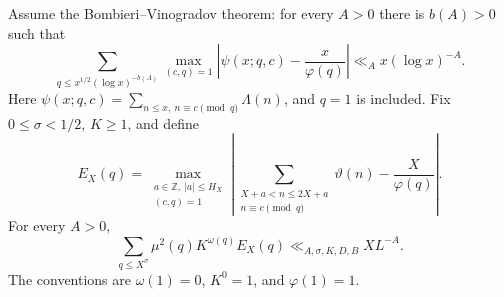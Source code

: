 \begin{lemma}\label{lem:arithmetic-1}

Assume the Bombieri--Vinogradov theorem: for every $A>0$ there is $b(A)>0$ such that
\begin{equation}
\sum_{q\le x^{1/2}(\log x)^{-b(A)}}
 \max_{(c,q)=1}\left|\psi(x;q,c)-\frac{x}{\varphi(q)}\right|
 \ll_A x(\log x)^{-A}.
\label{eq:arithmetic-BV}
\end{equation}
Here $\psi(x;q,c)=\sum_{n\le x,\ n\equiv c\pmod q}\Lambda(n)$, and $q=1$ is included. Fix $0\le\sigma<1/2$, $K\ge1$, and define
\[
E_X(q)=\max_{\substack{a\in\mathbb Z,\ |a|\le H_X\\(c,q)=1}}
\left|\sum_{\substack{X+a<n\le2X+a\\n\equiv c\pmod q}}\vartheta(n)
       -\frac{X}{\varphi(q)}\right|.
\]
For every $A>0$,
\begin{equation}
\sum_{q\le X^\sigma}\mu^2(q)K^{\omega(q)}E_X(q)
 \ll_{A,\sigma,K,D,B}X L^{-A}.
\label{eq:arithmetic-1}
\end{equation}
The conventions are $\omega(1)=0$, $K^0=1$, and $\varphi(1)=1$.

\end{lemma}
